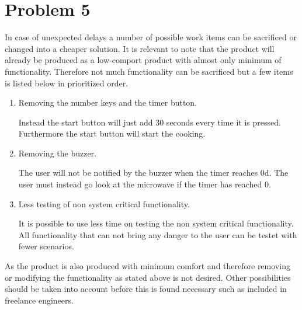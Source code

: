 \chapter{Problem 5}

In case of unexpected delays a number of possible work items can be sacrificed or changed into a cheaper solution. It is relevant to note that the product will already be produced as a low-comport product with almost only minimum of functionality. Therefore not much functionality can be sacrificed but a few items is listed below in prioritized order. 

\begin{enumerate}
\item Removing the number keys and the timer button. 

Instead the start button will just add 30 seconds every time it is pressed. Furthermore the start button will start the cooking.
	
\item Removing the buzzer. 

The user will not be notified by the buzzer when the timer reaches 0d. The user must instead go look at the microwave if the timer has reached 0.

\item Less testing of non system critical functionality.

It is possible to use less time on testing the non system critical functionality. All functionality that can not bring any danger to the user can be testet with fewer scenarios.

\end{enumerate}

As the product is also produced with minimum comfort and therefore removing or modifying the functionality as stated above is not desired. Other possibilities should be taken into account before this is found necessary such as included in freelance engineers.


